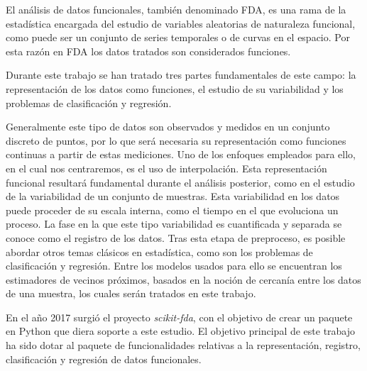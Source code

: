 El análisis de datos funcionales, también denominado FDA, es una rama de la
estadística encargada del estudio de variables aleatorias de naturaleza
funcional, como puede ser un conjunto de series temporales o de curvas en el
espacio. Por esta razón en FDA los datos tratados son considerados funciones.

Durante este trabajo se han tratado tres partes fundamentales de este campo:
la representación de los datos como funciones, el estudio de su variabilidad
y los problemas de clasificación y regresión.

Generalmente este tipo de datos son observados y medidos en un conjunto
discreto de puntos, por lo que será necesaria su representación como
funciones continuas a partir de estas mediciones.
Uno de los enfoques empleados para ello, en el cual nos centraremos, es el uso de interpolación.
Esta representación funcional resultará fundamental durante el análisis posterior,
como en el estudio de la variabilidad de un conjunto de muestras.
Esta variabilidad en los datos
puede proceder de su escala interna, como el tiempo en el que evoluciona un
proceso. La fase en la que este tipo variabilidad es cuantificada y separada se
conoce como el registro de los datos. Tras esta etapa de preproceso, es posible
abordar otros temas clásicos en estadística, como son los problemas de
clasificación y regresión. Entre los modelos usados para ello se encuentran los
estimadores de vecinos próximos, basados en la noción de cercanía entre los
datos de una muestra, los cuales serán tratados en este trabajo.

En el año 2017 surgió el proyecto \textit{scikit-fda}, con el objetivo de crear
un paquete en Python que diera soporte a este estudio. El objetivo principal
de este trabajo ha sido dotar al paquete de funcionalidades relativas a la
representación, registro, clasificación y regresión de datos funcionales.


